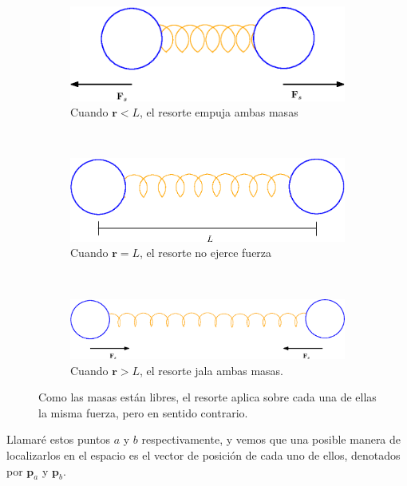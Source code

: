 \begin{figure}[hbt]
\centering
  \begin{subfigure}[b]{0.45\textwidth}
    \includegraphics[width=\textwidth]{Img/01/resortesJuntos}
    \caption{Cuando $\textbf{r}<L$, el resorte empuja ambas masas}
    \label{fig:juntos}
  \end{subfigure}
\\
  \begin{subfigure}[b]{0.5\textwidth}
    \includegraphics[width=\textwidth]{Img/01/resortesNormal}
    \caption{Cuando $\textbf{r}=L$, el resorte no ejerce fuerza}
    \label{fig:normales}
  \end{subfigure}
\\
  \begin{subfigure}[b]{0.7\textwidth}
    \includegraphics[width=\textwidth]{Img/01/resortesSeparados}
    \caption{Cuando $\textbf{r}>L$, el resorte jala ambas masas.}
    \label{fig:estirados}
  \end{subfigure}
 \caption[Masas libres en el espacio unidas por un resorte]{ 
 Como las masas están libres, el resorte aplica sobre cada una de ellas la misma fuerza, pero en sentido contrario.
 } \label{masaSuelta:fig}
\end{figure}

Llamaré estos puntos $a$ y $b$ respectivamente, y vemos que una posible manera de localizarlos en el espacio es el vector de posición de cada uno de ellos, denotados por $\textbf{p}_a$ y $\textbf{p}_b$.


